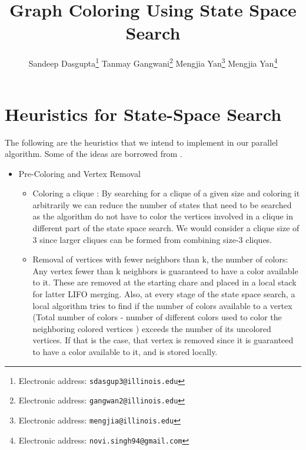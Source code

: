 \documentclass[10pt,twoside]{article}
\title{\textbf{Graph Coloring Using State Space Search}}
\author{Sandeep Dasgupta\thanks{Electronic address: \texttt{sdasgup3@illinois.edu}}
\qquad Tanmay Gangwani\thanks{Electronic address: \texttt{gangwan2@illinois.edu}}
\qquad Mengjia Yan\thanks{Electronic address: \texttt{mengjia@illinois.edu}}
\qquad  Mengjia Yan\thanks{Electronic address: \texttt{novi.singh94@gmail.com}}}
\begin{document}
\thispagestyle{empty}

\maketitle
\section{Heuristics for State-Space Search}
The following are the heuristics that we intend to implement in our parallel algorithm. Some of the ideas are borrowed from \cite{Kale1995}.
\begin{itemize}  \item Pre-Coloring and Vertex Removal 
    \begin{itemize} 
      \item Coloring a clique : By searching for a clique of a given size and
        coloring it arbitrarily we can reduce the number of states that need to
        be searched as the algorithm do not have to color the vertices involved
        in a clique in different part of the state space search.  We would
        consider a clique size of 3 since larger cliques can be formed from
        combining size-3 cliques.

    \item Removal of vertices with fewer neighbors than k, the number of colors:
      Any vertex fewer than k neighbors is guaranteed to have a color available
      to it. These are removed at the starting chare and placed in a local
      stack for latter LIFO merging. Also, at every stage of the state space
      search, a local algorithm tries to find if the number of colors available
      to a vertex (Total number of colors - number of different colors used to
          color the neighboring colored vertices ) exceeds the number of its
      uncolored vertices.  If that is the case, that vertex is removed since it
      is guaranteed to have a color available to it, and is stored locally.
    \end{itemize}


\end{itemize}
\end{document}
